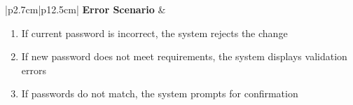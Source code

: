 \begin{table}[H]
\begin{tabular}{|p{2.7cm}|p{12.5cm}|}
            \hline
            \textbf{Error Scenario} & \begin{minipage}[t]{\linewidth}
                                          \begin{enumerate}[topsep=0pt,itemsep=1pt,parsep=0pt,partopsep=0pt]
                                              \item If current password is incorrect, the system rejects the change
                                              \item If new password does not meet requirements, the system displays validation
                                                    errors
                                              \item If passwords do not match, the system prompts for confirmation
                                          \end{enumerate}
                                      \end{minipage} \\
            \hline
        \end{tabular}
        \label{tab:eng-change-password}
    \end{table}
